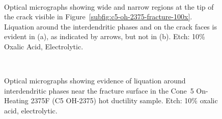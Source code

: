 \begin{figure}
\centering
{} \\
\caption{Optical micrographs showing wide and narrow regions at the tip of the crack visible in Figure~\ref{subfig:c5-oh-2375-fracture-100x}. Liquation around the interdendritic phases and on the crack faces is evident in (a), as indicated by arrows, but not in (b). Etch: 10\% Oxalic Acid, Electrolytic.}
\label{fig:c5-oh-2375-crack-tip-500x}
\end{figure}

\begin{figure}
\centering
{} \\
\caption{Optical micrographs showing evidence of liquation around interdendritic phases near the fracture surface in the Cone~5 On-Heating 2375\textdegree{}F (C5 OH-2375) hot ductility sample. Etch: 10\% oxalic acid, electrolytic.}
\label{fig:c5-oh-2375-liquation-fracture-surface}
\end{figure}





